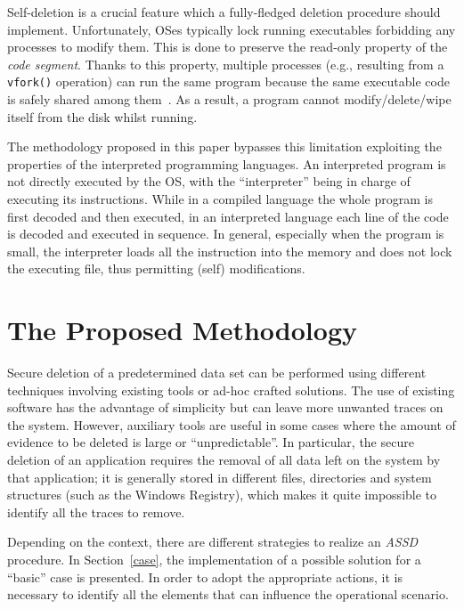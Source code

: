 \documentclass[10pt, conference, compsocconf]{IEEEtran}
\newcommand{\assd}{\emph{ASSD}\xspace}
\begin{document}

Self-deletion is a crucial feature which a fully-fledged deletion procedure should implement. Unfortunately, OSes typically lock running executables forbidding any processes to modify them.
This is done to preserve the read-only property of the \textit{code segment}. Thanks to this property, multiple processes (e.g., resulting from a \verb=vfork()= operation) can run the same program because the same executable code is safely shared among them~\cite{os}.
As a result, a program cannot modify/delete/wipe itself from the disk whilst running.

The methodology proposed in this paper bypasses this limitation exploiting the properties of the interpreted programming languages. An interpreted program is not directly executed by the OS, with the ``interpreter'' being in charge of executing its instructions. While in a compiled language the whole program is first decoded and then executed, in an interpreted language each line of the code is decoded and executed in sequence. In general, especially when the program is small, the interpreter loads all the instruction into the memory and does not lock the executing file, thus permitting (self) modifications.


\section{The Proposed Methodology}
Secure deletion of a predetermined data set can be performed using different techniques involving existing tools or ad-hoc crafted solutions. The use of existing software has the advantage of simplicity but can leave more unwanted traces on the system. However, auxiliary tools are useful in some cases where the amount of evidence to be deleted is large or ``unpredictable''. In particular, the secure deletion of an application requires the removal of all data left on the system by that application; it is generally stored in different files, directories and system structures (such as the Windows Registry), which makes it quite impossible to identify all the traces to remove.

Depending on the context, there are different strategies to realize an \assd procedure.
In Section~\ref{case}, the implementation of a possible solution for a ``basic'' case is presented.
In order to adopt the appropriate actions, it is necessary to identify all the elements that can influence the operational scenario.
\end{document}
